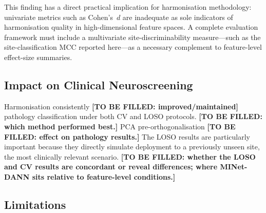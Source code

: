 \documentclass[preprint,12pt]{elsarticle}
\begin{document}
This finding has a direct practical implication for harmonisation
methodology: univariate metrics such as Cohen's~$d$ are inadequate
as sole indicators of harmonisation quality in high-dimensional
feature spaces.
A complete evaluation framework must include a multivariate
site-discriminability measure---such as the site-classification MCC
reported here---as a necessary complement to feature-level
effect-size summaries.

\subsection{Impact on Clinical Neuroscreening}
\label{subsec:disc_clinical}

Harmonisation consistently \textbf{[TO BE FILLED: improved/maintained]}
pathology classification under both CV and LOSO protocols.
\textbf{[TO BE FILLED: which method performed best.]}
PCA pre-orthogonalisation \textbf{[TO BE FILLED: effect on pathology
results.]}
The LOSO results are particularly important because they directly
simulate deployment to a previously unseen site, the most clinically
relevant scenario.
\textbf{[TO BE FILLED: whether the LOSO and CV results are concordant
or reveal differences; where MINet-DANN sits relative to feature-level
conditions.]}

\subsection{Limitations}
\label{subsec:limitations}
\end{document}
